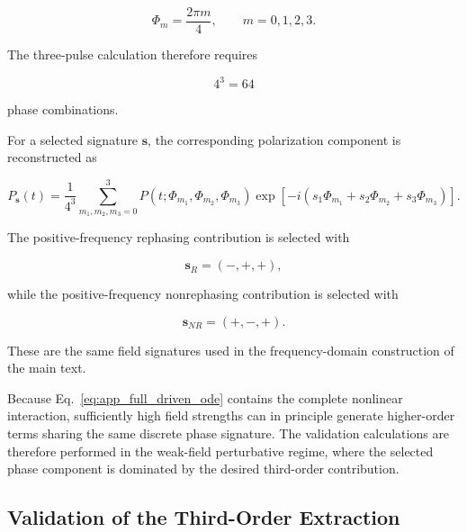 \documentclass[11pt]{article}
\begin{document}
\begin{equation}
\Phi_m
=
\frac{2\pi m}{4},
\qquad
m=0,1,2,3.
\label{eq:app_four_phase_values}
\end{equation}

The three-pulse calculation therefore requires

\begin{equation}
4^3
=
64
\end{equation}

phase combinations.

For a selected signature $\mathbf{s}$, the corresponding polarization
component is reconstructed as

\begin{equation}
\boxed{
P_{\mathbf{s}}(t)
=
\frac{1}{4^3}
\sum_{m_1,m_2,m_3=0}^{3}
P
\left(
t;
\Phi_{m_1},
\Phi_{m_2},
\Phi_{m_3}
\right)
\exp
\left[
-i
\left(
s_1\Phi_{m_1}
+
s_2\Phi_{m_2}
+
s_3\Phi_{m_3}
\right)
\right].
}
\label{eq:app_discrete_phase_projection}
\end{equation}

The positive-frequency rephasing contribution is selected with

\begin{equation}
\boxed{
\mathbf{s}_{R}
=
(-,+,+),
}
\label{eq:app_R_signature}
\end{equation}

while the positive-frequency nonrephasing contribution is selected
with

\begin{equation}
\boxed{
\mathbf{s}_{NR}
=
(+,-,+).
}
\label{eq:app_NR_signature}
\end{equation}

These are the same field signatures used in the frequency-domain
construction of the main text.

Because Eq.~\eqref{eq:app_full_driven_ode} contains the complete
nonlinear interaction, sufficiently high field strengths can in
principle generate higher-order terms sharing the same discrete phase
signature.  The validation calculations are therefore performed in the
weak-field perturbative regime, where the selected phase component is
dominated by the desired third-order contribution.


\subsection{Validation of the Third-Order Extraction}
\label{app:phase_cycle_validation}
\end{document}
